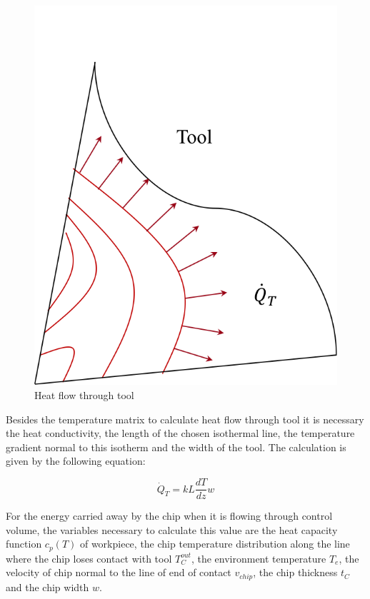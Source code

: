 			\begin{figure}[H]
				\centering
				\captionsetup{justification=centering}
				\includegraphics[scale=0.6]{Cap4/ToolHeat.png}
				\caption{Heat flow through tool}
				\label{fig:heattool}
			\end{figure}

			Besides the temperature matrix to calculate heat flow through tool it is necessary the heat conductivity, the length of the chosen isothermal line, the temperature gradient normal to this isotherm and the width of the tool. The calculation is given by the following equation:

			\begin{equation} 
			\label{eq_heattool}
				\dot{Q}_{T} = kL\frac{dT}{dz}w
			\end{equation}

			For the energy carried away by the chip when it is flowing through control volume, the variables necessary to calculate this value are the heat capacity function $c_{p}(T)$ of workpiece, the chip temperature distribution along the line where the chip loses contact with tool $T_{C}^{out}$, the environment temperature $T_{e}$, the velocity of chip normal to the line of end of contact $v_{chip}$, the chip thickness $t_{C}$ and the chip width $w$.

